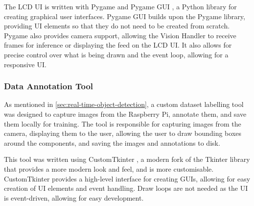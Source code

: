 The LCD UI is written with Pygame \cite{pygamedoc} and Pygame GUI \cite{pygamegui}, a Python library for creating graphical user interfaces. Pygame GUI builds upon the Pygame library, providing UI elements so that they do not need to be created from scratch. Pygame also provides camera support, allowing the Vision Handler to receive frames for inference or displaying the feed on the LCD UI. It also allows for precise control over what is being drawn and the event loop, allowing for a responsive UI.

\subsubsection{Data Annotation Tool}
As mentioned in \autoref{sec:real-time-object-detection}, a custom dataset labelling tool was designed to capture images from the Raspberry Pi, annotate them, and save them locally for training. The tool is responsible for capturing images from the camera, displaying them to the user, allowing the user to draw bounding boxes around the components, and saving the images and annotations to disk.

This tool was written using CustomTkinter \cite{customtkinter}, a modern fork of the Tkinter library that provides a more modern look and feel, and is more customisable. CustomTkinter provides a high-level interface for creating GUIs, allowing for easy creation of UI elements and event handling. Draw loops are not needed as the UI is event-driven, allowing for easy development.

